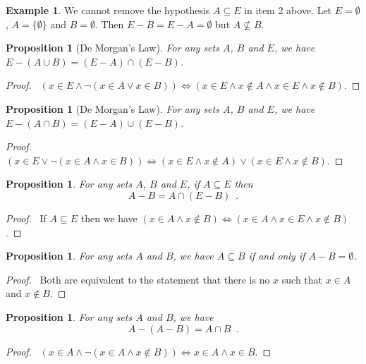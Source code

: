 \documentclass{report}
\let\qed\relax
\newtheorem{prop}[ax]{Proposition}
\theoremstyle{definition}
\newtheorem{ex}[ax]{Example}
\begin{document}
\begin{ex}
We cannot remove the hypothesis $A \subseteq E$ in item 2 above. Let $E = \emptyset$, $A = \{\emptyset\}$ and $B = \emptyset$. Then $E - B = E - A = \emptyset$ but $A \not\subseteq B$.
\end{ex}

\begin{prop}[De Morgan's Law]
For any sets $A$, $B$ and $E$, we have $E - (A \cup B) = (E - A) \cap (E - B)$.
\end{prop}

\begin{proof}
\pf\ $(x \in E \wedge \neg (x \in A \vee x \in B)) \Leftrightarrow (x \in E \wedge x \notin A \wedge x \in E \wedge x \notin B)$. \qed
\end{proof}

\begin{prop}[De Morgan's Law]
For any sets $A$, $B$ and $E$, we have $E - (A \cap B) = (E - A) \cup (E - B)$.
\end{prop}

\begin{proof}
\pf\ $(x \in E \vee \neg (x \in A \wedge x \in B)) \Leftrightarrow (x \in E \wedge x \notin A) \vee (x \in E \wedge x \notin B)$. \qed
\end{proof}

\begin{prop}
For any sets $A$, $B$ and $E$, if $A \subseteq E$ then\
\[ A - B = A \cap (E - B) \enspace . \]
\end{prop}

\begin{proof}
\pf\ If $A \subseteq E$ then we have $(x \in A \wedge x \notin B) \Leftrightarrow (x \in A \wedge x \in E \wedge x \notin B)$. \qed
\end{proof}

\begin{prop}
For any sets $A$ and $B$, we have $A \subseteq B$ if and only if $A - B = \emptyset$.
\end{prop}

\begin{proof}
\pf\ Both are equivalent to the statement that there is no $x$ such that $x \in A$ and $x \notin B$. \qed
\end{proof}

\begin{prop}
For any sets $A$ and $B$, we have
\[ A - (A - B) = A \cap B \enspace . \]
\end{prop}

\begin{proof}
\pf\ $(x \in A \wedge \neg (x \in A \wedge x \notin B)) \Leftrightarrow x \in A \wedge x \in B$. \qed
\end{proof}
\end{document}
